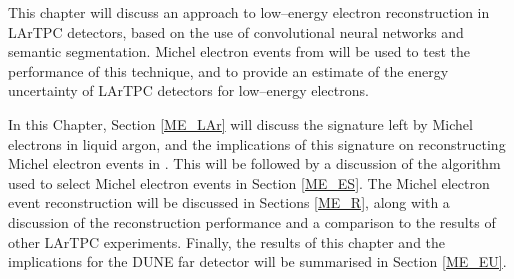 This chapter will discuss an approach to low--energy electron reconstruction 
in LArTPC detectors, based on the use of convolutional neural networks and 
semantic segmentation. Michel electron events from \protodune{} will be used 
to test the performance of this technique, and to provide an estimate of the 
energy uncertainty of LArTPC detectors for low--energy electrons.

In this Chapter, Section \ref{ME_LAr} will discuss the signature left by Michel
electrons in liquid argon, and the implications of this signature on
reconstructing Michel electron events in \protodune{}. This will be followed by
a discussion of the algorithm used to select Michel electron events in Section
\ref{ME_ES}. The Michel electron event reconstruction will be discussed in
Sections \ref{ME_R}, along with a discussion of the reconstruction performance
and a comparison to the results of other LArTPC experiments. Finally, the 
results of this chapter and the implications for the DUNE far detector will be 
summarised in Section \ref{ME_EU}.

